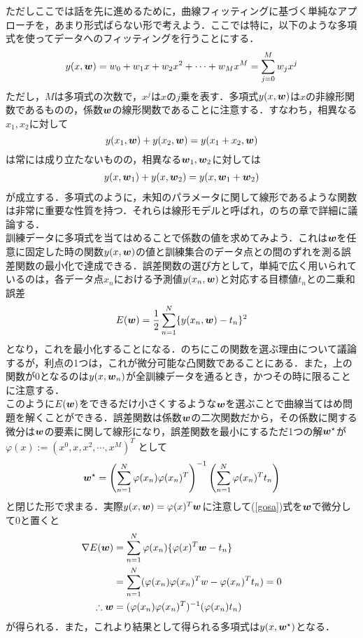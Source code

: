 \documentclass[a4j,11pt]{jsarticle}
\newcommand{\bw}{\mbox{\boldmath {$w$}}}
\numberwithin{equation}{section}
\begin{document}
ただしここでは話を先に進めるために，曲線フィッティングに基づく単純なアプローチを，あまり形式ばらない形で考えよう．ここでは特に，以下のような多項式を使ってデータへのフィッティングを行うことにする．
\begin{equation}
\begin{split}
y(x,{\bw}) = w_0 + w_1x + w_2x^2 + \cdots + w_Mx^M = \sum_{j=0}^M w_j x^j
\end{split}
\end{equation}
ただし，$M$は多項式の次数で，$x^j$は$x$の$j$乗を表す．多項式$y(x,{\bw})$は$x$の非線形関数であるものの，係数${\bw}$の線形関数であることに注意する．すなわち，相異なる$x_1,x_2$に対して
$$y(x_1,{\bw}) + y(x_2,{\bw}) = y(x_1+x_2,{\bw})$$
は常には成り立たないものの，相異なる${\bw}_1,{\bw}_2$に対しては
\begin{align*}
  y(x,{\bw}_1) + y(x,{\bw}_2) = y(x,{\bw}_1 + {\bw}_2)
\end{align*}
が成立する．多項式のように，未知のパラメータに関して線形であるような関数は非常に重要な性質を持つ．それらは線形モデルと呼ばれ，のちの章で詳細に議論する．\\
訓練データに多項式を当てはめることで係数の値を求めてみよう．これは${\bw}$を任意に固定した時の関数$y(x,{\bw})$の値と訓練集合のデータ点との間のずれを測る誤差関数の最小化で達成できる．誤差関数の選び方として，単純で広く用いられているのは，各データ点$x_n$における予測値$y(x_n,{\bw})$と対応する目標値$t_n$との二乗和誤差
\begin{align}
  \label{gosa}
E({\bw}) = \frac{1}{2}\sum_{n=1}^N\{y(x_n,{\bw}) - t_n\}^2
\end{align}
となり，これを最小化することになる．のちにこの関数を選ぶ理由について議論するが，利点の1つは，これが微分可能な凸関数であることにある．また，上の関数が$0$となるのは$y(x,{\bw}_n)$が全訓練データを通るとき，かつその時に限ることに注意する．\\


このように$E({\bw})$をできるだけ小さくするような$\bw$を選ぶことで曲線当てはめ問題を解くことができる．誤差関数は係数$\bw$の二次関数だから，その係数に関する微分は$\bw$の要素に関して線形になり，誤差関数を最小にするただ1つの解$\bw^{\star}$が
$\varphi(x) := (x^0 ,x,x^2,\cdots,x^M)^T$
として
\begin{align*}
\bw^{\star} = \left( \sum_{n=1}^N\varphi(x_n)\varphi(x_n)^T \right)^{-1}\left( \sum_{n=1}^N\varphi(x_n)^T t_n \right)
\end{align*}
と閉じた形で求まる．実際$y(x,\bw) = \varphi(x)^T \bw$に注意して(\ref{gosa})式を${\bw}$で微分して$0$と置くと
\begin{align*}
\nabla E(\bw) &= \sum_{n=1}^N\varphi(x_n)\{\varphi(x)^T \bw-t_n\}\\
                &= \sum_{n = 1}^N (\varphi(x_n)\varphi(x_n)^Tw - \varphi(x_n)^T t_n) = 0\\
                \therefore \bw &= (\varphi(x_n) \varphi(x_n)^T)^{-1}(\varphi(x_n)t_n)
\end{align*}
が得られる．また，これより結果として得られる多項式は$y(x,\bw^{\star})$となる．\\
\end{document}
